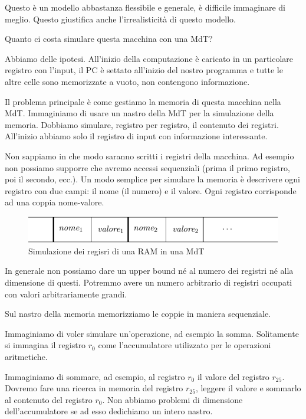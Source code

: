 Questo è un modello abbastanza flessibile e generale, è difficile immaginare di meglio. Questo
giustifica anche l'irrealisticità di questo modello.

Quanto ci costa simulare questa macchina con una MdT? 

Abbiamo delle ipotesi. All'inizio della computazione è caricato in un particolare registro con
l'input, il PC è settato all'inizio del nostro programma e tutte le altre celle sono memorizzate a
vuoto, non contengono informazione.

Il problema principale è come gestiamo la memoria di questa macchina nella MdT. Immaginiamo di
usare un nastro della MdT per la simulazione della memoria. Dobbiamo simulare, registro per
registro, il contenuto dei registri. All'inizio abbiamo solo il registro di input con informazione
interessante.

Non sappiamo in che modo saranno scritti i registri della macchina. Ad esempio non possiamo supporre
che avremo accessi sequenziali (prima il primo registro, poi il secondo, ecc.). Un modo semplice per
simulare la memoria è descrivere ogni registro con due campi: il nome (il numero) e il valore. Ogni
registro corrisponde ad una coppia nome-valore.

\begin{figure}[h]
    \begin{center}
        \includegraphics{./img/deterministic_complexity_classes/RAMsimulation.pdf}
        \caption{Simulazione dei regisri di una RAM in una MdT}
    \end{center}
\end{figure}

In generale non possiamo dare un upper bound né al numero dei registri né alla dimensione di
questi. Potremmo avere un numero arbitrario di registri occupati con valori arbitrariamente grandi.

Sul nastro della memoria memorizziamo le coppie in maniera sequenziale.

Immaginiamo di voler simulare un'operazione, ad esempio la somma. Solitamente si immagina il
registro $r_{0}$ come l'accumulatore utilizzato per le operazioni aritmetiche.

Immaginiamo di sommare, ad esempio, al registro $r_{0}$ il valore del registro $r_{25}$. Dovremo
fare una ricerca in memoria del registro $r_{25}$, leggere il valore e sommarlo al contenuto del
registro $r_{0}$. Non abbiamo problemi di dimensione dell'accumulatore se ad esso dedichiamo un
intero nastro.

